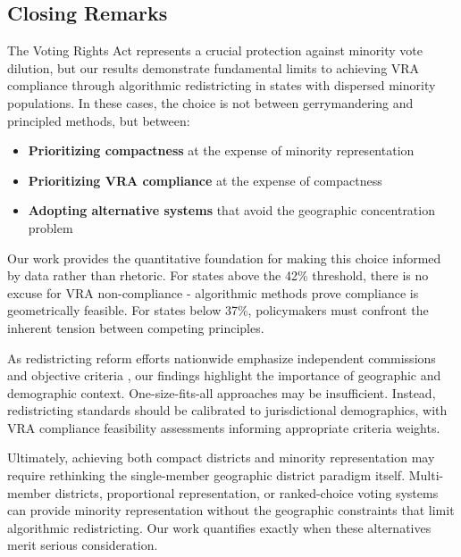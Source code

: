 \subsection{Closing Remarks}

The Voting Rights Act represents a crucial protection against minority vote dilution, but our results demonstrate fundamental limits to achieving VRA compliance through algorithmic redistricting in states with dispersed minority populations. In these cases, the choice is not between gerrymandering and principled methods, but between:

\begin{itemize}
\item \textbf{Prioritizing compactness} at the expense of minority representation
\item \textbf{Prioritizing VRA compliance} at the expense of compactness
\item \textbf{Adopting alternative systems} that avoid the geographic concentration problem
\end{itemize}

Our work provides the quantitative foundation for making this choice informed by data rather than rhetoric. For states above the 42\% threshold, there is no excuse for VRA non-compliance - algorithmic methods prove compliance is geometrically feasible. For states below 37\%, policymakers must confront the inherent tension between competing principles.

As redistricting reform efforts nationwide emphasize independent commissions and objective criteria \citep{levitt2010}, our findings highlight the importance of geographic and demographic context. One-size-fits-all approaches may be insufficient. Instead, redistricting standards should be calibrated to jurisdictional demographics, with VRA compliance feasibility assessments informing appropriate criteria weights.

Ultimately, achieving both compact districts and minority representation may require rethinking the single-member geographic district paradigm itself. Multi-member districts, proportional representation, or ranked-choice voting systems can provide minority representation without the geographic constraints that limit algorithmic redistricting. Our work quantifies exactly when these alternatives merit serious consideration.
